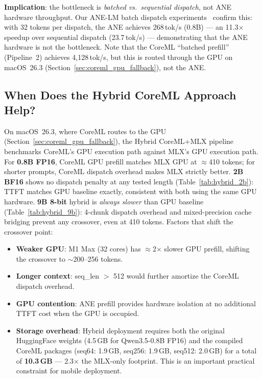 \documentclass[11pt]{article}
\begin{document}
\textbf{Implication}: the bottleneck is \emph{batched vs.\ sequential
dispatch}, not ANE hardware throughput.
Our ANE-LM batch dispatch experiments~\cite{anelmbatch} confirm this:
with 32 tokens per dispatch, the ANE achieves 268\,tok/s (0.8B) ---
an 11.3$\times$ speedup over sequential dispatch (23.7\,tok/s) ---
demonstrating that the ANE hardware is not the bottleneck.
Note that the CoreML ``batched prefill'' (Pipeline~2) achieves
4{,}128\,tok/s, but this is routed through the GPU on macOS~26.3
(Section~\ref{sec:coreml_gpu_fallback}), not the ANE.

\subsection{When Does the Hybrid CoreML Approach Help?}

On macOS~26.3, where CoreML routes to the GPU
(Section~\ref{sec:coreml_gpu_fallback}), the Hybrid CoreML+MLX pipeline
benchmarks CoreML's GPU execution path against MLX's GPU execution path.
For \textbf{0.8B FP16}, CoreML GPU prefill matches MLX GPU at
$\approx$410 tokens; for shorter prompts, CoreML dispatch overhead makes
MLX strictly better.
\textbf{2B BF16} shows no dispatch penalty at any tested length
(Table~\ref{tab:hybrid_2b}): TTFT matches GPU baseline exactly, consistent
with both using the same GPU hardware.
\textbf{9B 8-bit} hybrid is \emph{always slower} than GPU baseline
(Table~\ref{tab:hybrid_9b}): 4-chunk dispatch overhead and mixed-precision
cache bridging prevent any crossover, even at 410 tokens.
Factors that shift the crossover point:
\begin{itemize}[topsep=2pt,itemsep=1pt]
  \item \textbf{Weaker GPU}: M1 Max (32 cores) has $\approx$2$\times$
    slower GPU prefill, shifting the crossover to $\sim$200--256 tokens.
  \item \textbf{Longer context}: seq\_len $>$ 512 would further amortize
    the CoreML dispatch overhead.
  \item \textbf{GPU contention}: ANE prefill provides hardware isolation
    at no additional TTFT cost when the GPU is occupied.
  \item \textbf{Storage overhead}: Hybrid deployment requires both the
    original HuggingFace weights (4.5\,GB for Qwen3.5-0.8B FP16) and
    the compiled CoreML packages
    (seq64: 1.9\,GB, seq256: 1.9\,GB, seq512: 2.0\,GB)
    for a total of \textbf{10.3\,GB} --- 2.3$\times$ the MLX-only footprint.
    This is an important practical constraint for mobile deployment.
\end{itemize}
\end{document}

